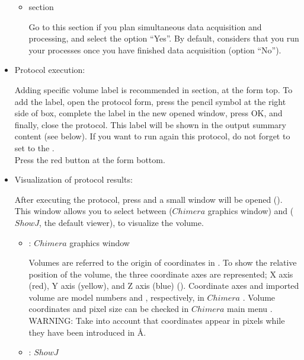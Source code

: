 \begin{itemize}
\begin{itemize}
  \item {} section
  
  Go to this section if you plan simultaneous data acquisition and processing, and select the option ``Yes''. By default, \scipion considers that you run your processes once you have finished data acquisition (option ``No'').
  
  \end{itemize}
  \item Protocol execution:
  
  Adding specific volume label is recommended in  section, at the form top. To add the label, open the protocol form, press the pencil symbol at the right side of  box, complete the label in the new opened window, press OK, and finally, close the protocol. This label will be shown in the output summary content (see below). If you want to run again this protocol, do not forget to set to  the .\\
  Press the  red button at the form bottom.
  
  \item Visualization of protocol results:
  
  After executing the protocol, press  and a small window will be opened (). This window allows you to select between  ($Chimera$ graphics window) and  ($ShowJ$, the default \scipion viewer), to visualize the volume.
   
   \begin{itemize}
   \item {}: $Chimera$ graphics window
   
   Volumes are referred to the origin of coordinates in \chimera. To show the relative position of the volume, the three coordinate axes are represented; X axis (red), Y axis (yellow), and Z axis (blue) (). Coordinate axes and imported volume are model numbers  and , respectively, in $Chimera$ . Volume coordinates and pixel size can be checked in $Chimera$ main menu . WARNING: Take into account that coordinates appear in pixels while they have been introduced in \AA.
   
  \item {}: $ShowJ$
   

\end{itemize}
\end{itemize}
